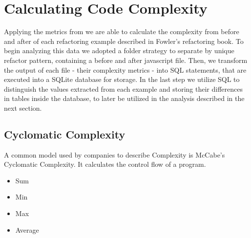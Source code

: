 \section{Calculating Code Complexity}

Applying the metrics from \cite{article:mozilla} we are able to calculate the complexity from before and after of each
refactoring example described in Fowler's refactoring book. To begin analyzing this data we adopted a folder strategy to
separate by unique refactor pattern, containing a before and after javascript file. Then, we transform the output of
each file - their complexity metrics - into SQL statements, that are executed into a SQLite database for storage. In the
last step we utilize SQL to distinguish the values extracted from each example and storing their differences in tables
inside the database, to later be utilized in the analysis described in the next section.


\subsection{Cyclomatic Complexity}

A common model used by companies to describe Complexity is McCabe's Cyclomatic Complexity. It calculates the control flow of a program.

\begin{itemize}
  \item Sum 
  \item Min 
  \item Max 
  \item Average 
\end{itemize}


